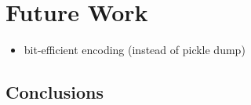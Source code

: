 \documentclass{egpubl}
\begin{document}
\section{Future Work}
\begin{itemize}
        \item bit-efficient encoding (instead of pickle dump)
\end{itemize}

\subsection{Conclusions}



%



\end{document}
